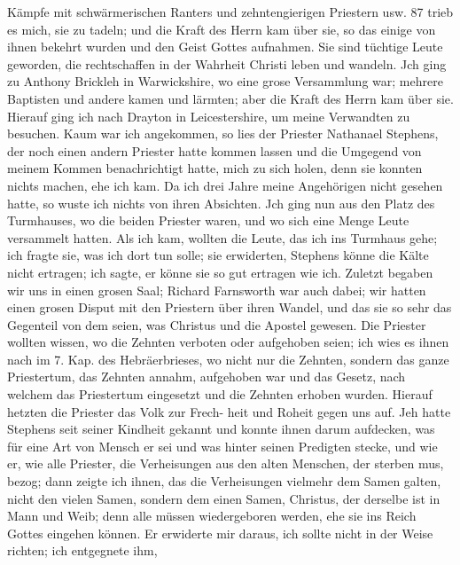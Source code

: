 Kämpfe mit schwärmerischen Ranters und zehntengierigen Priestern usw. 87
trieb es mich, sie zu tadeln; und die Kraft des Herrn kam über sie,
so das einige von ihnen bekehrt wurden und den Geist Gottes
aufnahmen. Sie sind tüchtige Leute geworden, die rechtschaffen
in der Wahrheit Christi leben und wandeln. Jch ging zu Anthony
Brickleh in Warwickshire, wo eine grose Versammlung war;
mehrere Baptisten und andere kamen und lärmten; aber die Kraft
des Herrn kam über sie.
Hierauf ging ich nach Drayton in Leicestershire, um meine
Verwandten zu besuchen. Kaum war ich angekommen, so lies
der Priester Nathanael Stephens, der noch einen andern Priester
hatte kommen lassen und die Umgegend von meinem Kommen
benachrichtigt hatte, mich zu sich holen, denn sie konnten nichts
machen, ehe ich kam. Da ich drei Jahre meine Angehörigen
nicht gesehen hatte, so wuste ich nichts von ihren Absichten. Jch
ging nun aus den Platz des Turmhauses, wo die beiden
Priester waren, und wo sich eine Menge Leute versammelt hatten.
Als ich kam, wollten die Leute, das ich ins Turmhaus gehe; ich
fragte sie, was ich dort tun solle; sie erwiderten, Stephens
könne die Kälte nicht ertragen; ich sagte, er könne sie so gut
ertragen wie ich. Zuletzt begaben wir uns in einen grosen Saal;
Richard Farnsworth war auch dabei; wir hatten einen grosen
Disput mit den Priestern über ihren Wandel, und das sie so
sehr das Gegenteil von dem seien, was Christus und die Apostel
gewesen. Die Priester wollten wissen, wo die Zehnten verboten
oder aufgehoben seien; ich wies es ihnen nach im 7. Kap. des
Hebräerbrieses, wo nicht nur die Zehnten, sondern das ganze
Priestertum, das Zehnten annahm, aufgehoben war und das
Gesetz, nach welchem das Priestertum eingesetzt und die Zehnten
erhoben wurden. Hierauf hetzten die Priester das Volk zur Frech-
heit und Roheit gegen uns auf. Jeh hatte Stephens seit seiner
Kindheit gekannt und konnte ihnen darum aufdecken, was für
eine Art von Mensch er sei und was hinter seinen Predigten
stecke, und wie er, wie alle Priester, die Verheisungen aus den
alten Menschen, der sterben mus, bezog; dann zeigte ich ihnen,
das die Verheisungen vielmehr dem Samen galten, nicht den
vielen Samen, sondern dem einen Samen, Christus, der derselbe
ist in Mann und Weib; denn alle müssen wiedergeboren werden,
ehe sie ins Reich Gottes eingehen können. Er erwiderte mir
daraus, ich sollte nicht in der Weise richten; ich entgegnete ihm,


